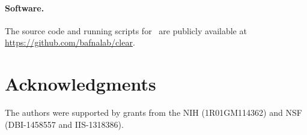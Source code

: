 \paragraph{Software.}
The source code and running scripts for \comale\ are publicly available at \\
\href{https://github.com/bafnalab/clear}{https://github.com/bafnalab/clear}.

\section*{Acknowledgments}
The authors were supported by grants from the NIH (1R01GM114362) and
NSF (DBI-1458557 and IIS-1318386).
